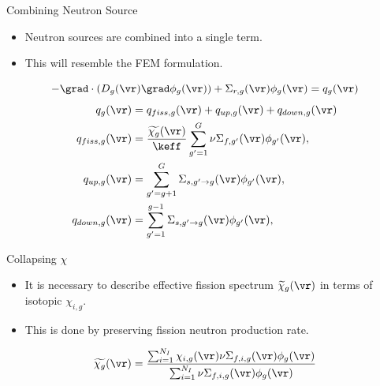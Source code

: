 \begin{frame}{Combining Neutron Source}
  \begin{itemize}
    \item Neutron sources are combined into a single term.
    \item This will resemble the FEM formulation.
  \end{itemize}
  \begin{equation}
    \label{eq:multigroup_source}
    - \grad \cdot( D_g(\vr) \grad \phi_g(\vr)) + \Sigma_{r,g}(\vr) \phi_g(\vr) = 
      q_g(\vr)
  \end{equation}
  \begin{align}
    \label{eq:q}
    q_g(\vr) &= q_{fiss,g}(\vr) + q_{up,g}(\vr) + q_{down,g}(\vr) \\
    \label{eq:qfiss}
    q_{fiss,g}(\vr) &= \frac{\widetilde{\chi_g}(\vr)}{\keff} \sum_{g'=1}^{G} 
      \nu \Sigma_{f,g'}(\vr) \phi_{g'}(\vr), \\
    \label{eq:qup}
    q_{up,g}(\vr) &= \sum_{g'=g+1}^{G} \Sigma_{s,g' \rightarrow g}(\vr)
      \phi_{g'}(\vr), \\
    \label{eq:qdown}
    q_{down,g}(\vr) &= \sum_{g'=1}^{g-1} \Sigma_{s,g' \rightarrow g}(\vr)
      \phi_{g'}(\vr),
  \end{align}
\end{frame}

\begin{frame}{Collapsing $\chi$}
  \begin{itemize}
    \item It is necessary to describe effective fission spectrum
      $\widetilde{\chi}_g(\vr)$ in terms of isotopic $\chi_{i,g}$.
    \item This is done by preserving fission neutron production rate.
  \end{itemize}
  \begin{equation}
    \label{eq:chi_collapse}
    \widetilde{\chi_g}(\vr) = \frac{\sum_{i=1}^{N_I} \chi_{i,g}(\vr)
      \nu \Sigma_{f,i,g}(\vr) \phi_g(\vr)}
      {\sum_{i=1}^{N_I} \nu \Sigma_{f,i,g}(\vr) \phi_g(\vr)}
  \end{equation}
\end{frame}

